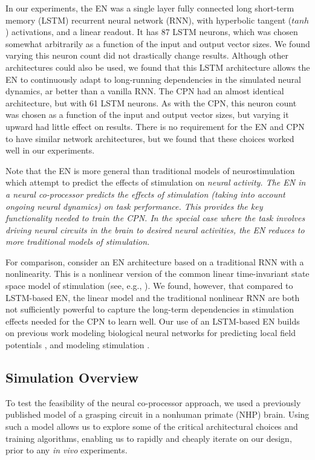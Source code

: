 \documentclass[12pt]{iopart}
\begin{document}
In our experiments, the EN was a single layer fully connected long short-term memory (LSTM) recurrent
neural network (RNN), with hyperbolic tangent ($tanh$) activations, and a linear readout. It has 87 LSTM neurons,
which was chosen somewhat arbitrarily as a function of the input and output vector sizes. We found varying this neuron
count did not drastically change results. Although other architectures could also be used, we found that this
LSTM architecture allows the EN to continuously adapt to long-running dependencies in the simulated neural dynamics, 
ar better than a vanilla RNN. The CPN had an almost identical architecture, but with 61 LSTM neurons. As with the CPN,
this neuron count was chosen as a function of the input and output vector sizes, but varying it upward had little effect on results.
There is no requirement for the EN and CPN to have similar network architectures, but we found that these choices worked
well in our experiments.

Note that the EN is more general than traditional models of neurostimulation which attempt to predict the effects of
stimulation on \em{neural activity}. The EN in a neural co-processor predicts the effects of stimulation (taking into
account ongoing neural dynamics) on \em{task performance}. This provides the key functionality needed to train the
CPN. In the special case where the task involves driving neural circuits in the brain to desired neural activities,
the EN reduces to more traditional models of stimulation.

For comparison, consider an EN architecture based on a traditional RNN with a nonlinearity. This is a nonlinear version
of the common linear time-invariant state space model of stimulation (see, e.g.,  \cite{shanechi.stimmodel}). 
We found, however, that compared to LSTM-based EN, the linear model and the traditional nonlinear RNN are both not
sufficiently powerful to capture the long-term dependencies in stimulation effects needed for the CPN to learn well.
Our use of an LSTM-based EN builds on previous work modeling biological neural networks for predicting local field potentials
\cite{kim.lstm}, and modeling stimulation \cite{guclu.lstm}.

\subsection{Simulation Overview}
To test the feasibility of the neural co-processor approach, we used a previously published model of a
grasping circuit in a nonhuman primate (NHP) brain. Using such a model allows us to explore some of the critical
architectural choices and training algorithms, enabling us to rapidly and cheaply iterate on our
design, prior to any \textit{in vivo} experiments. 
\end{document}
